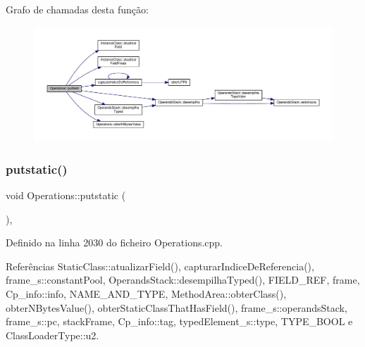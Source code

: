 Grafo de chamadas desta função\+:
\nopagebreak
\begin{figure}[H]
\begin{center}
\leavevmode
\includegraphics[width=350pt]{classOperations_a56385f246d3d4d5c5674c988a1f0e658_cgraph}
\end{center}
\end{figure}
\mbox{\label{classOperations_ac6791ccfd8adf30d8f80b1f679f0b146}} 
\subsubsection{\texorpdfstring{putstatic()}{putstatic()}}
{\footnotesize\ttfamily void Operations\+::putstatic (\begin{DoxyParamCaption}{ }\end{DoxyParamCaption})\hspace{0.3cm}{\ttfamily [static]}, {\ttfamily [private]}}



Definido na linha 2030 do ficheiro Operations.\+cpp.



Referências Static\+Class\+::atualizar\+Field(), capturar\+Indice\+De\+Referencia(), frame\+\_\+s\+::constant\+Pool, Operands\+Stack\+::desempilha\+Typed(), F\+I\+E\+L\+D\+\_\+\+R\+EF, frame, Cp\+\_\+info\+::info, N\+A\+M\+E\+\_\+\+A\+N\+D\+\_\+\+T\+Y\+PE, Method\+Area\+::obter\+Class(), obter\+N\+Bytes\+Value(), obter\+Static\+Class\+That\+Has\+Field(), frame\+\_\+s\+::operands\+Stack, frame\+\_\+s\+::pc, stack\+Frame, Cp\+\_\+info\+::tag, typed\+Element\+\_\+s\+::type, T\+Y\+P\+E\+\_\+\+B\+O\+OL e Class\+Loader\+Type\+::u2.

